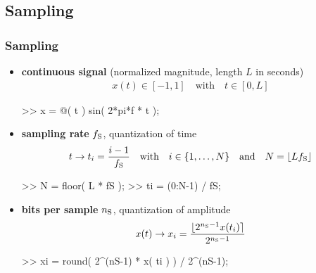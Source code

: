 
\subsection{Sampling}

\begin{frame}[fragile]
	\frametitle{Sampling}
	\begin{itemize}
		\item \textbf{continuous signal} (normalized magnitude, length $L$ in seconds)
			\begin{align*}
				x(t)\in[-1,1]\quad\textrm{with}\quad t\in[0,L]
			\end{align*}
			\begin{code}
>> x = @( t ) sin( 2*pi*f * t ); \color{medium}%
			\end{code}
		\item \textbf{sampling rate} $f_{\textrm S}$, quantization of time
			\begin{align*}
				t\rightarrow t_i=\frac{i-1}{f_{\textrm S}}\quad\textrm{with}\quad i\in\{1,\ldots,N\}\quad\textrm{and}\quad N=\lfloor Lf_{\textrm S}\rfloor
			\end{align*}
			\begin{code}
>> N = floor( L * fS ); \color{medium}%
>> ti = (0:N-1) / fS; \color{medium}%
			\end{code}
		\item \textbf{bits per sample} $n_{\textrm S}$, quantization of amplitude
			\begin{align*}
				x(t)\rightarrow x_i=\frac{\lfloor2^{n_{\textrm S}-1}x(t_i)\rceil}{2^{n_{\textrm S}-1}}
			\end{align*}
			\begin{code}
>> xi = round( 2^(nS-1) * x( ti ) ) / 2^(nS-1); \color{medium}%
			\end{code}
	\end{itemize}
\end{frame}


